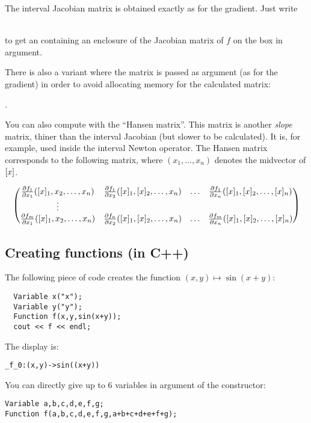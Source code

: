 The interval Jacobian matrix is obtained exactly as for the gradient.
Just write \\
\centerline{}\\ to get an 
containing an enclosure of the Jacobian matrix of $f$ on the box in argument.

There is also a variant where the matrix is passed as argument
(as for the gradient) in order to avoid allocating memory for the calculated matrix:\\
\centerline{.}

You can also compute with \ibex the ``Hansen matrix''. This matrix
is another {\it slope} matrix, thiner than the interval Jacobian (but slower to be calculated).
It is, for example, used inside the interval Newton operator.
The Hansen matrix corresponds to the following matrix, where $(x_1,\ldots,x_n)$ denotes
the midvector of $[x]$.

$$\begin{pmatrix}
\frac{\partial f_1}{\partial x_1}([x]_1,x_2,\ldots,x_n) & \frac{\partial f_1}{\partial x_2}([x]_1,[x]_2,\ldots,x_n) & \ldots & \frac{\partial f_1}{\partial x_n}([x]_1,[x]_2,\ldots,[x]_n) \\
\vdots & \\
\frac{\partial f_m}{\partial x_1}([x]_1,x_2,\ldots,x_n) & \frac{\partial f_n}{\partial x_2}([x]_1,[x]_2,\ldots,x_n) & \ldots & \frac{\partial f_m}{\partial x_n}([x]_1,[x]_2,\ldots,[x]_n) \\
\end{pmatrix}$$

\subsection{Creating functions (in C++)}\label{sec:mod-func-cpp}

The following piece of code creates the function
$(x,y)\mapsto \sin(x+y)$:

\begin{lstlisting}	
  Variable x("x");
  Variable y("y");
  Function f(x,y,sin(x+y));
  cout << f << endl;
\end{lstlisting}

The display is:
\begin{lstlisting}
_f_0:(x,y)->sin((x+y))
\end{lstlisting}

You can directly give up to 6 variables in argument of the  constructor:
\begin{lstlisting}
Variable a,b,c,d,e,f,g;
Function f(a,b,c,d,e,f,g,a+b+c+d+e+f+g);
\end{lstlisting}	

